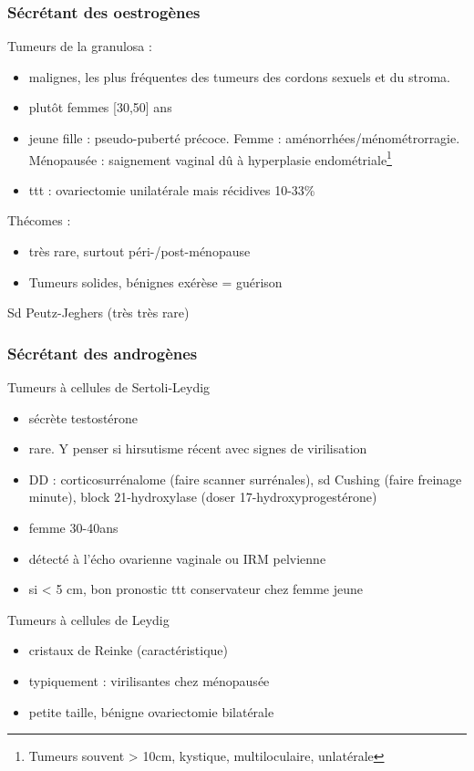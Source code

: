 \documentclass[11pt]{article}
\begin{document}
\subsubsection{Sécrétant des oestrogènes}
\label{sec:orgb7fb0bb}
Tumeurs de la granulosa : 
\begin{itemize}
\item malignes, les plus fréquentes des tumeurs des cordons sexuels et du stroma.
\item plutôt femmes [30,50] ans
\item jeune fille : pseudo-puberté précoce. Femme :
aménorrhées/ménométrorragie. Ménopausée : saignement vaginal dû à hyperplasie
endométriale\footnote{Tumeurs souvent > 10cm, kystique, multiloculaire, unlatérale}
\item ttt : ovariectomie unilatérale mais récidives 10-33\%
\end{itemize}

Thécomes : 
\begin{itemize}
\item très rare, surtout péri-/post-ménopause
\item Tumeurs solides, bénignes \thus exérèse = guérison
\end{itemize}
Sd Peutz-Jeghers (très très rare)

\subsubsection{Sécrétant des androgènes}
\label{sec:org4832623}
Tumeurs à cellules de Sertoli-Leydig 
\begin{itemize}
\item sécrète testostérone
\item rare. Y penser si hirsutisme récent avec signes de virilisation
\item DD : corticosurrénalome (faire scanner surrénales), sd Cushing (faire freinage
minute), block 21-hydroxylase (doser 17-hydroxyprogestérone)
\item femme 30-40ans
\item détecté à l'écho ovarienne vaginale ou IRM pelvienne
\item si < 5 cm, bon pronostic \thus ttt conservateur chez femme jeune
\end{itemize}

Tumeurs à cellules de Leydig
\begin{itemize}
\item cristaux de Reinke (caractéristique)
\item typiquement : virilisantes chez ménopausée
\item petite taille, bénigne \thus ovariectomie bilatérale
\end{itemize}
\end{document}
